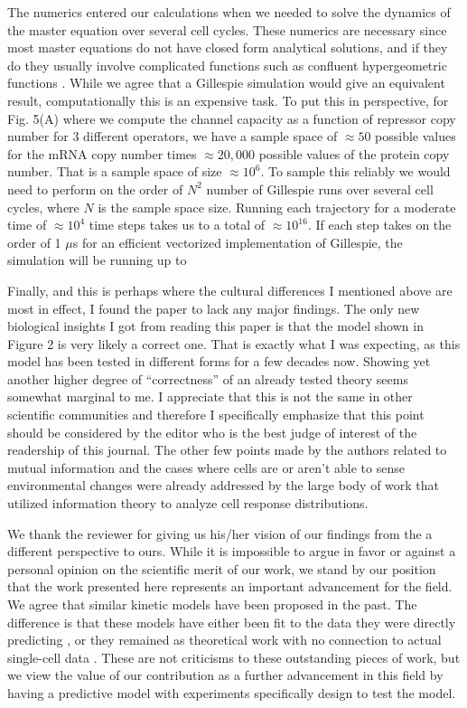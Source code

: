 The numerics entered our calculations when we needed to solve the dynamics of
the master equation over several cell cycles. These numerics are necessary since
most master equations do not have closed form analytical solutions, and if they
do they usually involve complicated functions such as confluent hypergeometric
functions \cite{Peccoud1995, Shahrezaei2008}. While we agree that a Gillespie
simulation would  give an equivalent result, computationally this is an
expensive task. To put this in perspective, for Fig. 5(A) where we compute the
channel capacity as a function of repressor copy number for 3 different
operators, we have a sample space of $\approx 50$ possible values for the mRNA
copy number times $\approx 20,000$ possible values of the protein copy number.
That is a sample space of size $\approx 10^6$. To sample this reliably we would
need to perform on the order of $N^2$ number of Gillespie runs over
several cell cycles, where $N$ is the sample space size. Running each trajectory
for a moderate time of $\approx 10^4$ time steps takes us to a total of
$\approx 10^{16}$. If each step takes on the order of 1 $\mu$s for an efficient
vectorized implementation of Gillespie, the simulation will be running up to



\begin{tcolorbox}
Finally, and this is perhaps where the cultural differences I mentioned above
are most in effect, I found the paper to lack any major findings. The only new
biological insights I got from reading this paper is that the model shown in
Figure 2 is very likely a correct one. That is exactly what I was expecting, as
this model has been tested in different forms for a few decades now. Showing yet
another higher degree of “correctness” of an already tested theory seems
somewhat marginal to me. I appreciate that this is not the same in other
scientific communities and therefore I specifically emphasize that this point
should be considered by the editor who is the best judge of interest of the
readership of this journal. The other few points made by the authors related to
mutual information and the cases where cells are or aren’t able to sense
environmental changes were already addressed by the large body of work that
utilized information theory to analyze cell response distributions.
\end{tcolorbox}

We thank the reviewer for giving us his/her vision of our findings from the a
different perspective to ours. While it is impossible to argue in favor or
against a personal opinion on the scientific merit of our work, we stand by our
position that the work presented here represents an important advancement for
the field. We agree that similar kinetic models have been proposed in the past.
The difference is that these models have either been fit to the data they were
directly predicting \cite{Golding2005}, or they remained as theoretical work
with no connection to actual single-cell data \cite{Shahrezaei2008}. These are
not criticisms to these outstanding pieces of work, but we view the value of our
contribution as a further advancement in this field by having a predictive
model with experiments specifically design to test the model.

